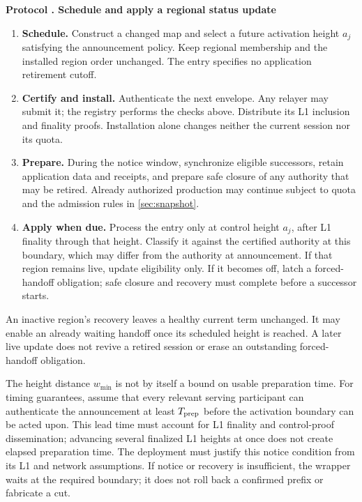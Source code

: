 \documentclass[11pt,a4paper,onecolumn]{article}
\newcounter{protocol}
\newenvironment{protocol}[2]{\refstepcounter{protocol}\label{#1}
\begin{mdframed}[nobreak=true,linewidth=.6pt,skipabove=9pt,skipbelow=9pt,
innertopmargin=7pt,innerbottommargin=7pt]\small
\noindent\textbf{Protocol \theprotocol. #2}\par\smallskip}{\end{mdframed}}
\begin{document}
\begin{protocol}{alg:status}{Schedule and apply a regional status update}
\begin{enumerate}[label=\textbf{C\arabic*.}]
\item \textbf{Schedule.} Construct a changed map and select a future
activation height $a_j$ satisfying the announcement policy. Keep regional
membership and the installed region order unchanged. The entry specifies
no application retirement cutoff.
\item \textbf{Certify and install.} Authenticate the next envelope. Any
relayer may submit it; the registry performs the checks above. Distribute
its L1 inclusion and finality proofs. Installation alone changes neither
the current session nor its quota.
\item \textbf{Prepare.} During the notice window, synchronize eligible
successors, retain application data and receipts, and prepare safe closure
of any authority that may be retired. Already authorized production may
continue subject to quota and the admission rules in \cref{sec:snapshot}.
\item \textbf{Apply when due.} Process the entry only at control height
$a_j$, after L1 finality through that height. Classify it against the
certified authority at this boundary, which may differ from the authority
at announcement. If that region remains live, update eligibility only.
If it becomes off, latch a forced-handoff obligation; safe closure and
recovery must complete before a successor starts.
\end{enumerate}
\end{protocol}
An inactive region's recovery leaves a healthy current term unchanged.
It may enable an already waiting handoff once its scheduled height is
reached. A later live update does not revive a retired session or erase an
outstanding forced-handoff obligation.

The height distance $w_{\min}$ is not by itself a bound on usable preparation
time. For timing guarantees, assume that every relevant serving participant
can authenticate the announcement at least $T_{\rm prep}$ before the
activation boundary can be acted upon. This lead time must account for L1
finality and control-proof dissemination; advancing several finalized L1
heights at once does not create elapsed preparation time. The deployment
must justify this notice condition from its L1 and network assumptions.
If notice or recovery is insufficient, the wrapper waits at the required
boundary; it does not roll back a confirmed prefix or fabricate a cut.
\end{document}
